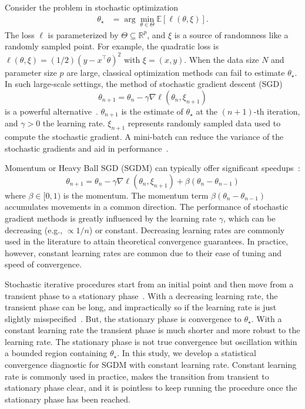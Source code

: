 \documentclass[conference]{IEEEtran}
\newcommand{\Ex}[1]{\mathbb{E}[ #1 ]}
\begin{document}
Consider the problem in stochastic optimization
\begin{align}\label{eq:stoch_opt}
\theta_\star &= \arg \min_{\theta \in \Theta} \Ex{ \ell ( \theta, \xi ) }.
\end{align}
The loss $\ell$ is parameterized by $\Theta \subseteq \mathbb{R}^p$, and $\xi$ is a source of randomness like a randomly sampled point.  For example, the quadratic loss is $\ell (\theta, \xi) = (1/2) ( y - x^\top \theta )^2$ with $\xi = (x,y)$. When the data size $N$ and parameter size $p$ are large, classical optimization methods can fail to estimate $\theta_\star$. In such large-scale settings, the method of stochastic gradient descent (SGD)
\begin{equation}\label{eq:sgd-vanilla}
\theta_{n+1} = \theta_{n} - \gamma \nabla \ell ( \theta_{n}, \xi_{n+1} )
\end{equation}
is a powerful alternative~\cite{Proc:Bottou_COMPSTAT10, Collect:Bottou_LNCS12, Proc:Zhang_ICML04, Article:Toulis_SAC15}.
$\theta_{n+1}$ is the estimate of $\theta_\star$ at the $(n+1)$-th iteration, and $\gamma > 0$ the learning rate.  $\xi_{n+1}$ represents randomly sampled data used to compute the stochastic gradient.  A mini-batch  can reduce the variance of the stochastic gradients and aid in performance~\cite{Proc:Reddi_NIPS15}.

Momentum or Heavy Ball SGD (SGDM) can typically offer significant speedups~\cite{Article:Polyak_1964}: 
\begin{equation}\label{eq:sgdm}
\theta_{n+1} = \theta_{n} - \gamma \nabla \ell ( \theta_{n}, \xi_{n+1} ) + \beta ( \theta_{n} - \theta_{n-1} )
\end{equation}
where $\beta \in [0,1)$ is the momentum.
The momentum term $\beta ( \theta_{n} - \theta_{n-1} )$ accumulates movements in a common direction.
The performance of stochastic gradient methods is greatly influenced by the learning rate $\gamma$, which can be decreasing (e.g., $\propto 1/n$) or constant. 
Decreasing learning rates are commonly used in the literature to attain theoretical convergence guarantees. In practice, however, constant learning rates are common due to their ease of tuning and speed of convergence.

Stochastic iterative procedures start from an initial point and then move from a transient phase to a stationary phase~\cite{Article:Murata_1998}. 
With a decreasing learning rate, the transient phase can be long, and impractically so if the learning rate is just slightly misspecified~\cite{Article:Nemirovski_SIOPT09, Article:Toulis_AOS17}. 
But, the stationary phase is convergence to $\theta_\star$.  With a constant learning rate the transient phase is much shorter and more robust to the learning rate. 
The stationary phase is not true convergence but oscillation within a bounded region containing $\theta_\star$. In this study, we develop a statistical convergence diagnostic for SGDM with constant learning rate. Constant learning rate is commonly used in practice, makes the transition from transient to stationary phase 
clear, and  it is pointless to keep running the procedure once the stationary phase has been reached. 
\end{document}
